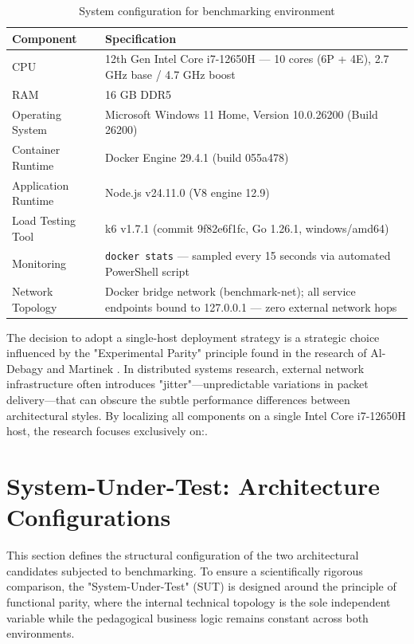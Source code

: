 \begin{table}[h!]
    \centering
    \caption{System configuration for benchmarking environment}
    \label{tab:system-config}
    \small
    \renewcommand{\arraystretch}{1.2}
    \begin{tabularx}{\textwidth}{l X}
        \toprule
        \textbf{Component} & \textbf{Specification} \\
        \midrule
        CPU & 12th Gen Intel Core i7-12650H — 10 cores (6P + 4E), 2.7 GHz base / 4.7 GHz boost \\
        RAM & 16 GB DDR5 \\
        Operating System & Microsoft Windows 11 Home, Version 10.0.26200 (Build 26200) \\
        Container Runtime & Docker Engine 29.4.1 (build 055a478) \\
        Application Runtime & Node.js v24.11.0 (V8 engine 12.9) \\
        Load Testing Tool & k6 v1.7.1 (commit 9f82e6f1fc, Go 1.26.1, windows/amd64) \\
        Monitoring & \texttt{docker stats} — sampled every 15 seconds via automated PowerShell script \\
        Network Topology & Docker bridge network (benchmark-net); all service endpoints bound to 127.0.0.1 — zero external network hops \\
        \bottomrule
    \end{tabularx}
\end{table}

The decision to adopt a single-host deployment strategy is a strategic choice influenced by the "Experimental Parity" principle found in the research of Al-Debagy and Martinek \cite{Omar_Al-Debagy}. In distributed systems research, external network infrastructure often introduces "jitter"—unpredictable variations in packet delivery—that can obscure the subtle performance differences between architectural styles. By localizing all components on a single Intel Core i7-12650H host, the research focuses exclusively on:.

\section{System-Under-Test: Architecture Configurations}

This section defines the structural configuration of the two architectural candidates subjected to benchmarking. To ensure a scientifically rigorous comparison, the "System-Under-Test" (SUT) is designed around the principle of functional parity, where the internal technical topology is the sole independent variable while the pedagogical business logic remains constant across both environments.

